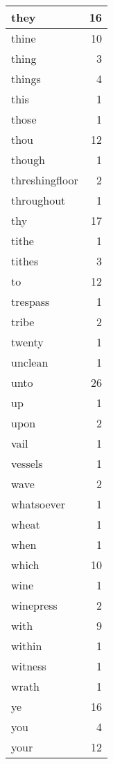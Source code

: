 \begin{center}
\begin{longtable}{l|r}
they & 16 \\ \hline
thine & 10 \\ \hline
thing & 3 \\ \hline
things & 4 \\ \hline
this & 1 \\ \hline
those & 1 \\ \hline
thou & 12 \\ \hline
though & 1 \\ \hline
threshingfloor & 2 \\ \hline
throughout & 1 \\ \hline
thy & 17 \\ \hline
tithe & 1 \\ \hline
tithes & 3 \\ \hline
to & 12 \\ \hline
trespass & 1 \\ \hline
tribe & 2 \\ \hline
twenty & 1 \\ \hline
unclean & 1 \\ \hline
unto & 26 \\ \hline
up & 1 \\ \hline
upon & 2 \\ \hline
vail & 1 \\ \hline
vessels & 1 \\ \hline
wave & 2 \\ \hline
whatsoever & 1 \\ \hline
wheat & 1 \\ \hline
when & 1 \\ \hline
which & 10 \\ \hline
wine & 1 \\ \hline
winepress & 2 \\ \hline
with & 9 \\ \hline
within & 1 \\ \hline
witness & 1 \\ \hline
wrath & 1 \\ \hline
ye & 16 \\ \hline
you & 4 \\ \hline
your & 12 \\ \hline
\end{longtable}
\end{center}



\normalsize



